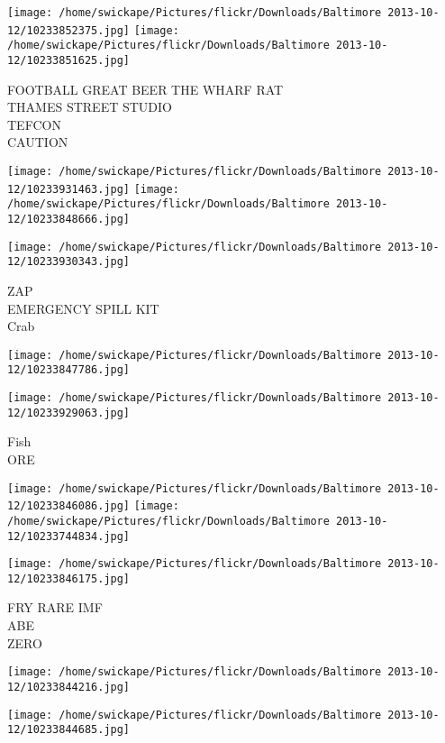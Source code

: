 \documentclass[10pt,letterpaper]{article}
\begin{document}
\texttt{[image: /home/swickape/Pictures/flickr/Downloads/Baltimore 2013-10-12/10233852375.jpg]}
\texttt{[image: /home/swickape/Pictures/flickr/Downloads/Baltimore 2013-10-12/10233851625.jpg]}

FOOTBALL GREAT BEER THE WHARF RAT\\
THAMES STREET STUDIO\\
TEFCON\\
CAUTION
\pagebreak

\texttt{[image: /home/swickape/Pictures/flickr/Downloads/Baltimore 2013-10-12/10233931463.jpg]}
\texttt{[image: /home/swickape/Pictures/flickr/Downloads/Baltimore 2013-10-12/10233848666.jpg]}

\vspace{0.25in}
\texttt{[image: /home/swickape/Pictures/flickr/Downloads/Baltimore 2013-10-12/10233930343.jpg]}

ZAP\\
EMERGENCY SPILL KIT\\
Crab
\pagebreak

\texttt{[image: /home/swickape/Pictures/flickr/Downloads/Baltimore 2013-10-12/10233847786.jpg]}

\vspace{0.25in}
\texttt{[image: /home/swickape/Pictures/flickr/Downloads/Baltimore 2013-10-12/10233929063.jpg]}

Fish\\
ORE
\pagebreak

\texttt{[image: /home/swickape/Pictures/flickr/Downloads/Baltimore 2013-10-12/10233846086.jpg]}
\texttt{[image: /home/swickape/Pictures/flickr/Downloads/Baltimore 2013-10-12/10233744834.jpg]}

\vspace{0.25in}
\texttt{[image: /home/swickape/Pictures/flickr/Downloads/Baltimore 2013-10-12/10233846175.jpg]}

FRY RARE IMF\\
ABE\\
ZERO
\pagebreak

\texttt{[image: /home/swickape/Pictures/flickr/Downloads/Baltimore 2013-10-12/10233844216.jpg]}

\vspace{0.25in}
\texttt{[image: /home/swickape/Pictures/flickr/Downloads/Baltimore 2013-10-12/10233844685.jpg]}
\end{document}
